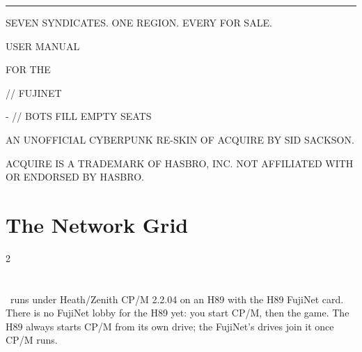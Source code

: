 \documentclass[12pt,letterpaper]{article}
\begin{document}
\begin{titlepage}
\machine
\vspace*{1.6in}
{\color{amber}\rule{\linewidth}{2pt}}\par\vspace{14pt}
{\fontsize{44}{48}\selectfont \game\par}\vspace{10pt}
{\fontsize{12}{16}\selectfont\color{steel} SEVEN SYNDICATES. ONE REGION. EVERY \MakeUppercase{} FOR SALE.\par}
\vspace{14pt}{\color{amber}\rule{\linewidth}{2pt}}\par
\vspace{0.35in}
{\fontsize{24}{30}\selectfont USER MANUAL\par}\vspace{4pt}
{\fontsize{14}{18}\selectfont\color{amber} FOR THE \MakeUppercase{\PlatformLong}\par}
\vspace{0.4in}
{\fontsize{12}{16}\selectfont \PlatformMachines \quad // \quad FUJINET\par
{}- \MakeUppercase{} \quad // \quad BOTS FILL EMPTY SEATS\par}
\vfill
{\fontsize{8.5}{11}\selectfont\color{steel}
AN UNOFFICIAL CYBERPUNK RE-SKIN OF ACQUIRE BY SID SACKSON.\par
ACQUIRE IS A TRADEMARK OF HASBRO, INC. NOT AFFILIATED WITH OR ENDORSED BY HASBRO.\par}
\end{titlepage}

\renewcommand{\secstatus}{THE SETTING \quad // \quad THE OBJECT \quad // \quad THE END}
\chapter{The Network Grid}
\begin{multicols}{2}
\end{multicols}

\renewcommand{\secstatus}{REGION \quad // \quad STATUS \quad // \quad HANDLE}
\chapter{}
\begin{sloppypar}
\game\ runs under Heath/Zenith CP/M 2.2.04 on an H89 with the H89 FujiNet card. There is no FujiNet lobby for
the H89 yet: you start CP/M, then the game. The H89 always starts CP/M from its own drive; the FujiNet's drives
join it once CP/M runs.
\end{sloppypar}
\end{document}
